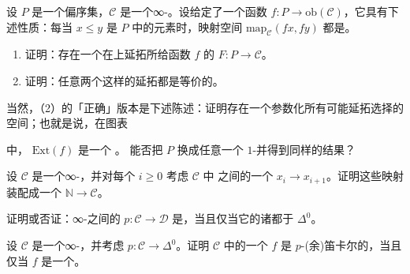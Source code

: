 \begin{exercise}\label{ex:poset-extension}
设 $P$ 是一个偏序集，$\mathcal{C}$ 是一个∞-\trCategory{}。设给定了一个函数
$f\colon P \to \mathrm{ob}(\mathcal{C})$，它具有下述性质：每当 $x \le y$ 是 $P$
中的元素时，映射空间 $\mathrm{map}_{\mathcal{C}}(fx, fy)$ 都是\trContractible{}。
\begin{enumerate}[label=(\arabic*)]
  \item 证明：存在一个在\trObject{}上延拓所给函数 $f$ 的\trFunctor{}%
        $F\colon P \to \mathcal{C}$。
  \item 证明：任意两个这样的延拓都是等价的。
\end{enumerate}
当然，（2）的「正确」版本是下述陈述：证明存在一个参数化所有可能延拓选择的%
\trContractible{}空间；也就是说，在\trPullback{}图表
\begin{center}
\end{center}
中，\trSimplicialSet{} $\mathrm{Ext}(f)$ 是一个\trContractible{} \trKanComplex{}。
能否把 $P$ 换成任意一个 $1$-\trCategory{}并得到同样的结果？
\end{exercise}

\begin{exercise}\label{ex:sequential-functor}
设 $\mathcal{C}$ 是一个∞-\trCategory{}，并对每个 $i \ge 0$ 考虑 $\mathcal{C}$ 中%
\trObject{}之间的一个\trMorphism{} $x_i \to x_{i+1}$。证明这些映射装配成一个%
\trFunctor{} $\mathbb{N} \to \mathcal{C}$。
\end{exercise}

\begin{exercise}\label{ex:isofibration-trivial-fibres}
证明或否证：∞-\trCategories{}之间的\trIsofibration{} $p\colon \mathcal{C} \to \mathcal{D}$
是\trTrivialFibration{}，当且仅当它的诸\trFibre{}都\trJoyalEquivalence{}于
$\Delta^0$。
\end{exercise}

\begin{exercise}\label{ex:p-cocartesian-over-point}
设 $\mathcal{C}$ 是一个∞-\trCategory{}，并考虑\trInnerFibration{}%
$p\colon \mathcal{C} \to \Delta^0$。证明 $\mathcal{C}$ 中的一个\trMorphism{} $f$
是 $p$-(余)笛卡尔的，当且仅当 $f$ 是一个\trEquivalence{}。
\end{exercise}

